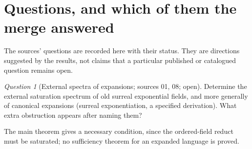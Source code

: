 \documentclass[11pt,letterpaper]{article}
\numberwithin{equation}{section}
\theoremstyle{definition}
\theoremstyle{remark}
\newtheorem{question}[question]{Question}
\begin{document}
\section{Questions, and which of them the merge answered}\label{univ:sec:questions}

The sources' questions are recorded here with their status. They are
directions suggested by the results, not claims that a particular published or
catalogued question remains open.

\begin{question}[External spectra of expansions; sources 01, 08; open]\label{univ:q:exponential}
Determine the external saturation spectrum of old surreal exponential fields,
and more generally of canonical expansions (surreal exponentiation, a specified
derivation). What extra obstruction appears after naming them?
\end{question}
The main theorem gives a necessary condition, since the ordered-field reduct
must be saturated; no sufficiency theorem for an expanded language is proved.
\end{document}
